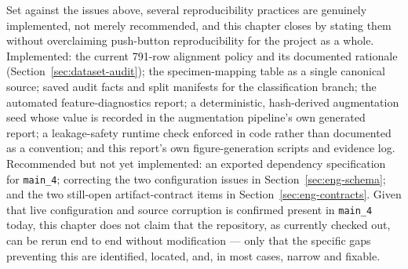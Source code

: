 Set against the issues above, several reproducibility practices are
genuinely implemented, not merely recommended, and this chapter closes by
stating them without overclaiming push-button reproducibility for the
project as a whole. Implemented: the current 791-row alignment policy and
its documented rationale (Section~\ref{sec:dataset-audit}); the specimen-mapping
table as a single canonical source; saved audit facts and split manifests
for the classification branch; the automated feature-diagnostics report;
a deterministic, hash-derived augmentation seed whose value is recorded in
the augmentation pipeline's own generated report; a leakage-safety runtime
check enforced in code rather than documented as a convention; and this
report's own figure-generation scripts and evidence log. Recommended but
not yet implemented: an exported dependency specification for
\texttt{main\_4}; correcting the two configuration issues in
Section~\ref{sec:eng-schema}; and the two still-open artifact-contract
items in Section~\ref{sec:eng-contracts}. Given that live configuration
and source corruption is confirmed present in \texttt{main\_4} today, this
chapter does not claim that the repository, as currently checked out, can
be rerun end to end without modification — only that the specific gaps
preventing this are identified, located, and, in most cases, narrow and
fixable.
